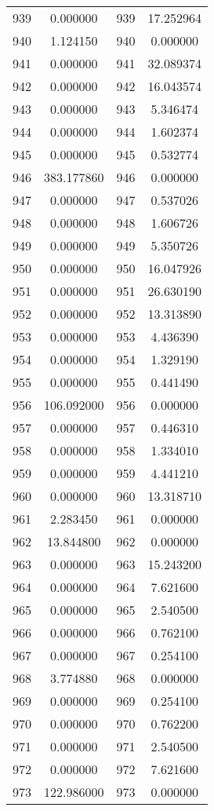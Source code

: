 \documentclass[12pt]{article}
\begin{document}
\begin{longtable}{@{}cccc@{}}
939 & 0.000000 & 939 & 17.252964 \\
940 & 1.124150 & 940 & 0.000000 \\
941 & 0.000000 & 941 & 32.089374 \\
942 & 0.000000 & 942 & 16.043574 \\
943 & 0.000000 & 943 & 5.346474 \\
944 & 0.000000 & 944 & 1.602374 \\
945 & 0.000000 & 945 & 0.532774 \\
946 & 383.177860 & 946 & 0.000000 \\
947 & 0.000000 & 947 & 0.537026 \\
948 & 0.000000 & 948 & 1.606726 \\
949 & 0.000000 & 949 & 5.350726 \\
950 & 0.000000 & 950 & 16.047926 \\
951 & 0.000000 & 951 & 26.630190 \\
952 & 0.000000 & 952 & 13.313890 \\
953 & 0.000000 & 953 & 4.436390 \\
954 & 0.000000 & 954 & 1.329190 \\
955 & 0.000000 & 955 & 0.441490 \\
956 & 106.092000 & 956 & 0.000000 \\
957 & 0.000000 & 957 & 0.446310 \\
958 & 0.000000 & 958 & 1.334010 \\
959 & 0.000000 & 959 & 4.441210 \\
960 & 0.000000 & 960 & 13.318710 \\
961 & 2.283450 & 961 & 0.000000 \\
962 & 13.844800 & 962 & 0.000000 \\
963 & 0.000000 & 963 & 15.243200 \\
964 & 0.000000 & 964 & 7.621600 \\
965 & 0.000000 & 965 & 2.540500 \\
966 & 0.000000 & 966 & 0.762100 \\
967 & 0.000000 & 967 & 0.254100 \\
968 & 3.774880 & 968 & 0.000000 \\
969 & 0.000000 & 969 & 0.254100 \\
970 & 0.000000 & 970 & 0.762200 \\
971 & 0.000000 & 971 & 2.540500 \\
972 & 0.000000 & 972 & 7.621600 \\
973 & 122.986000 & 973 & 0.000000 \\

\end{longtable}
\end{document}
